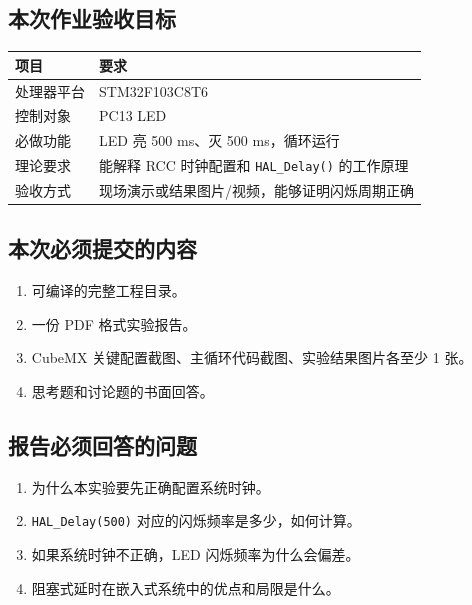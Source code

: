 \documentclass[
  chinese,
  UTF8,
  oneside,
  openany]{ctexbook}
\providecommand{\tightlist}{%
  \setlength{\itemsep}{0pt}\setlength{\parskip}{0pt}}
\begin{document}
\subsection{本次作业验收目标}\label{ux672cux6b21ux4f5cux4e1aux9a8cux6536ux76eeux6807-1}

\begin{longtable}[]{@{}ll@{}}
\toprule\noalign{}
项目 & 要求 \\
\midrule\noalign{}
\endhead
\bottomrule\noalign{}
\endlastfoot
处理器平台 & STM32F103C8T6 \\
控制对象 & PC13 LED \\
必做功能 & LED 亮 500 ms、灭 500 ms，循环运行 \\
理论要求 & 能解释 RCC 时钟配置和 \texttt{HAL\_Delay()} 的工作原理 \\
验收方式 & 现场演示或结果图片/视频，能够证明闪烁周期正确 \\
\end{longtable}

\subsection{本次必须提交的内容}\label{ux672cux6b21ux5fc5ux987bux63d0ux4ea4ux7684ux5185ux5bb9-1}

\begin{enumerate}
\def\labelenumi{\arabic{enumi}.}
\tightlist
\item
  可编译的完整工程目录。
\item
  一份 PDF 格式实验报告。
\item
  CubeMX 关键配置截图、主循环代码截图、实验结果图片各至少 1 张。
\item
  思考题和讨论题的书面回答。
\end{enumerate}

\subsection{报告必须回答的问题}\label{ux62a5ux544aux5fc5ux987bux56deux7b54ux7684ux95eeux9898-1}

\begin{enumerate}
\def\labelenumi{\arabic{enumi}.}
\tightlist
\item
  为什么本实验要先正确配置系统时钟。
\item
  \texttt{HAL\_Delay(500)} 对应的闪烁频率是多少，如何计算。
\item
  如果系统时钟不正确，LED 闪烁频率为什么会偏差。
\item
  阻塞式延时在嵌入式系统中的优点和局限是什么。
\end{enumerate}
\end{document}
